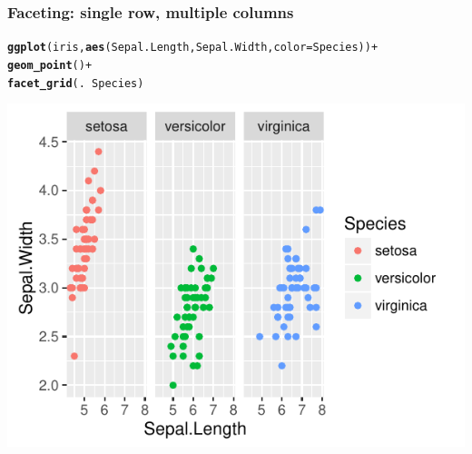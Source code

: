 \documentclass{beamer}\usepackage[]{graphicx}\usepackage[]{color}
\makeatletter
\newcommand{\hlopt}[1]{\textcolor[rgb]{0,0,0}{#1}}%
\newcommand{\hlstd}[1]{\textcolor[rgb]{0.345,0.345,0.345}{#1}}%
\newcommand{\hlkwc}[1]{\textcolor[rgb]{0.333,0.667,0.333}{#1}}%
\newcommand{\hlkwd}[1]{\textcolor[rgb]{0.737,0.353,0.396}{\textbf{#1}}}%
\newenvironment{kframe}{%
 \def\at@end@of@kframe{}%
 \ifinner\ifhmode%
  \def\at@end@of@kframe{\end{minipage}}%
  \begin{minipage}{\columnwidth}%
 \fi\fi%
 \def\FrameCommand##1{\hskip\@totalleftmargin \hskip-\fboxsep
 \colorbox{shadecolor}{##1}\hskip-\fboxsep
     \hskip-\linewidth \hskip-\@totalleftmargin \hskip\columnwidth}%
 \MakeFramed {\advance\hsize-\width
   \@totalleftmargin\z@ \linewidth\hsize
   \@setminipage}}%
 {\par\unskip\endMakeFramed%
 \at@end@of@kframe}
\newenvironment{knitrout}{}{} %
\makeatother
\begin{document}

\begin{frame}[fragile]
\frametitle{Faceting: single row, multiple columns}
\begin{knitrout}\footnotesize
{}\color{fgcolor}\begin{kframe}
\begin{alltt}
\hlkwd{ggplot}\hlstd{(iris,} \hlkwd{aes}\hlstd{(Sepal.Length, Sepal.Width,} \hlkwc{color} \hlstd{= Species))} \hlopt{+}
    \hlkwd{geom_point}\hlstd{()} \hlopt{+}
    \hlkwd{facet_grid}\hlstd{(.} \hlopt{~} \hlstd{Species)}
\end{alltt}
\end{kframe}

{\centering \includegraphics[width=.75\linewidth]{figure/facet_grid2-1} 

}



\end{knitrout}
\end{frame}

\end{document}
